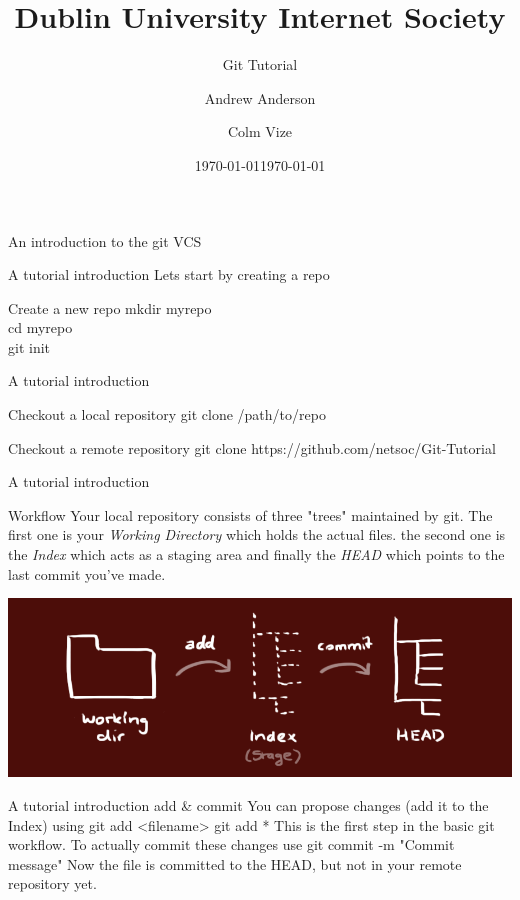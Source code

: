 \documentclass[xcolor=dvipsnames]{beamer}
\begin{document}
\title[Netsoc Git Tutorial] {Dublin University Internet Society}
\author[A. Anderson \& C. Vize]{Andrew Anderson  \and Colm Vize }
\subtitle{Git Tutorial}{An introduction to the git VCS}
\date{\today}
\titlepage
\begin{frame}{A tutorial introduction}
	Lets start by creating a repo
	\begin{block}{Create a new repo}
		mkdir myrepo\\
		cd myrepo\\
		git init
	\end{block}
\end{frame}

\begin{frame}{A tutorial introduction}
	
	\begin{block}{Checkout a local repository}
		git clone /path/to/repo
	\end{block}
	\begin{block}{Checkout a remote repository}
		git clone https://github.com/netsoc/Git-Tutorial 
	\end{block}
\end{frame}

\begin{frame}{A tutorial introduction}

	\begin{block}{Workflow}
		Your local repository consists of three "trees" maintained by git. The first one is 
		your \emph{Working Directory} which holds the actual files. the second one is the \emph{Index} which acts as a staging area and finally the \emph{HEAD} which points to the last commit you've made.
	\end{block}
	\begin{center}
		\includegraphics[scale=0.3]{trees.png}
	\end{center}
\end{frame}

\begin{frame}{A tutorial introduction}
	add & commit
You can propose changes (add it to the Index) using
git add <filename>
git add *
This is the first step in the basic git workflow. To actually commit these changes use
git commit -m "Commit message"
Now the file is committed to the HEAD, but not in your remote repository yet.
\date{\today}
\end{frame}
\end{document}
